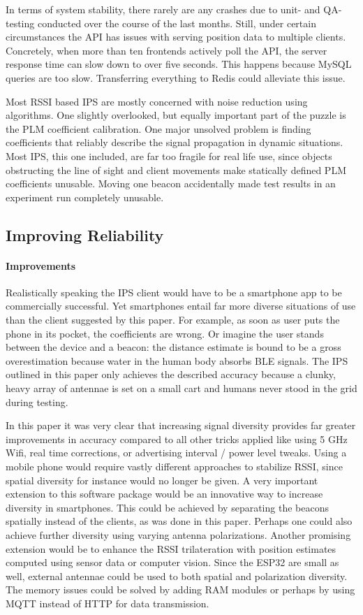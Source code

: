 \documentclass[a4paper, oneside]{ipsreport}
\begin{document}
In terms of system stability, there rarely are any crashes due to unit- and QA-testing conducted over the course of the last months. Still, under certain circumstances the API has issues with serving position data to multiple clients. Concretely, when more than ten frontends actively poll the API, the server response time can slow down to over five seconds. This happens because MySQL queries are too slow. Transferring everything to Redis could alleviate this issue.

Most RSSI based IPS are mostly concerned with noise reduction using algorithms. One slightly overlooked, but equally important part of the puzzle is the PLM coefficient calibration. One major unsolved problem is finding coefficients that reliably describe the signal propagation in dynamic situations. Most IPS, this one included, are far too fragile for real life use, since objects obstructing the line of sight and client movements make statically defined PLM coefficients unusable. Moving one beacon accidentally made test results in an experiment run completely unusable.

\subsection{Improving Reliability}
\paragraph{Improvements}
Realistically speaking the IPS client would have to be a smartphone app to be commercially successful. Yet smartphones entail far more diverse situations of use than the client suggested by this paper. For example, as soon as user puts the phone in its pocket, the coefficients are wrong. Or imagine the user stands between the device and a beacon: the distance estimate is bound to be a gross overestimation because water in the human body absorbs BLE signals. The IPS outlined in this paper only achieves the described accuracy because a clunky, heavy array of antennae is set on a small cart and humans never stood in the grid during testing.

In this paper it was very clear that increasing signal diversity provides far greater improvements in accuracy compared to all other tricks applied like using 5 GHz Wifi, real time corrections, or advertising interval / power level tweaks. Using a mobile phone would require vastly different approaches to stabilize RSSI, since spatial diversity for instance would no longer be given. A very important extension to this software package would be an innovative way to increase diversity in smartphones. This could be achieved by separating the beacons spatially instead of the clients, as was done in this paper. Perhaps one could also achieve further diversity using varying antenna polarizations. Another promising extension would be to enhance the RSSI trilateration with position estimates computed using sensor data or computer vision. Since the ESP32 are small as well, external antennae could be used to both spatial and polarization diversity. The memory issues could be solved by adding RAM modules or perhaps by using MQTT instead of HTTP for data transmission.
\end{document}
